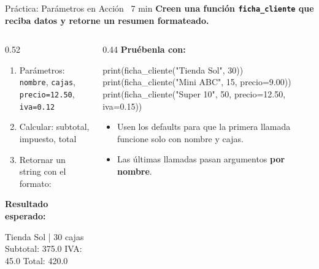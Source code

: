 \documentclass[aspectratio=169, 11pt]{beamer}
\begin{document}
\begin{frame}[fragile,shrink=28]{Práctica: Parámetros en Acción \hfill
    {\normalsize\color{arcaRed}\faClock\ 7 min}}
  \vspace{-6pt}
  {\footnotesize\color{arcaDark}\bfseries
    Creen una función \texttt{ficha\_cliente} que reciba datos
    y retorne un resumen formateado.}

  \vspace{4pt}
  \begin{columns}[T]
    \begin{column}{0.52\textwidth}
      {\footnotesize
      \begin{enumerate}\setlength{\itemsep}{3pt}
        \item Parámetros: \texttt{nombre}, \texttt{cajas},
              \texttt{precio=12.50}, \texttt{iva=0.12}
        \item Calcular: subtotal, impuesto, total
        \item Retornar un string con el formato:
      \end{enumerate}
      }

      \vspace{2pt}
      {\scriptsize\color{textMuted}\bfseries Resultado esperado:}
      \begin{outputblock}
Tienda Sol | 30 cajas
  Subtotal: 375.0
  IVA:      45.0
  Total:    420.0
      \end{outputblock}
    \end{column}

    \begin{column}{0.44\textwidth}
      {\scriptsize\color{textMuted}\bfseries Pruébenla con:}
      \begin{pyblock}
print(ficha_cliente("Tienda Sol", 30))
print(ficha_cliente("Mini ABC", 15,
      precio=9.00))
print(ficha_cliente("Super 10", 50,
      precio=12.50, iva=0.15))
      \end{pyblock}

      \vspace{4pt}
      {\scriptsize\color{textMuted}
      \begin{itemize}\setlength{\itemsep}{3pt}
        \item[{\color{arcaRed}\scriptsize\faLightbulb}]
          Usen los defaults para que la primera
          llamada funcione solo con nombre y cajas.
        \item[{\color{arcaRed}\scriptsize\faLightbulb}]
          Las últimas llamadas pasan argumentos
          \textbf{por nombre}.
      \end{itemize}
      }
    \end{column}
  \end{columns}
\end{frame}
\end{document}
